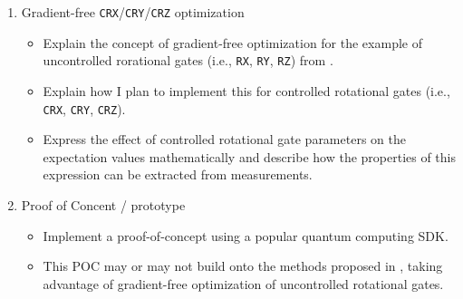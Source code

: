 \begin{enumerate}
    \item Gradient-free \texttt{CRX}/\texttt{CRY}/\texttt{CRZ} optimization
    \begin{itemize}
        \item
            Explain the concept of gradient-free optimization for the example of
            uncontrolled rorational gates (i.e., \texttt{RX}, \texttt{RY},
            \texttt{RZ}) from
            \cite{wendenius_gradient-free_2023,ostaszewski_structure_2021}.
        \item
            Explain how I plan to implement this for controlled rotational gates
            (i.e., \texttt{CRX}, \texttt{CRY}, \texttt{CRZ}).
        \item
            Express the effect of controlled rotational gate parameters on the
            expectation values mathematically and describe how the properties of
            this expression can be extracted from measurements.
    \end{itemize}

    \item Proof of Concent / prototype
    \begin{itemize}
        \item
            Implement a proof-of-concept using a popular quantum computing SDK.
        \item
            This POC may or may not build onto the methods proposed in
            \cite{wendenius_gradient-free_2023,ostaszewski_structure_2021},
            taking advantage of gradient-free optimization of uncontrolled
            rotational gates.
    \end{itemize}


\end{enumerate}
